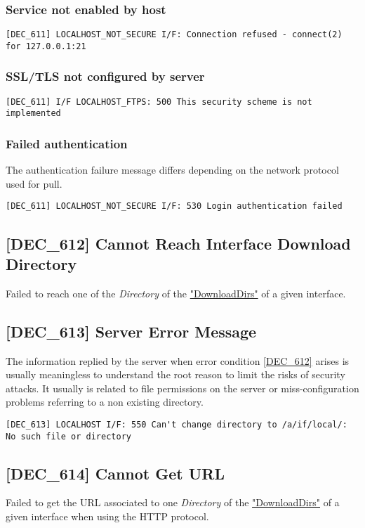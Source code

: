 \documentclass[dec_sum_main.tex]{subfiles}
\begin{document}
\subsubsection{Service not enabled by host}
\begin{verbatim}
[DEC_611] LOCALHOST_NOT_SECURE I/F: Connection refused - connect(2) for 127.0.0.1:21
\end{verbatim}

\subsubsection{SSL/TLS not configured by server}
\begin{verbatim}
[DEC_611] I/F LOCALHOST_FTPS: 500 This security scheme is not implemented
\end{verbatim}

\subsubsection{Failed authentication}
The authentication failure message differs depending on the network protocol used for pull.
\begin{verbatim}
[DEC_611] LOCALHOST_NOT_SECURE I/F: 530 Login authentication failed
\end{verbatim}

\subsection{[DEC\_612] Cannot Reach Interface Download Directory}
\label{DEC612}
Failed to reach one of the \textit{Directory} of the \hyperref[DownloadDirs]{"DownloadDirs"} of a given interface.

\subsection{[DEC\_613] Server Error Message }
The information replied by the server when error condition \hyperref[DEC612]{[DEC\_612]} arises is usually meaningless to understand the root reason to limit the risks of security attacks. It usually is related to file permissions on the server or miss-configuration problems referring to a non existing directory.
\begin{verbatim}
[DEC_613] LOCALHOST I/F: 550 Can't change directory to /a/if/local/: No such file or directory
\end{verbatim}

\label{DEC614}
\subsection{[DEC\_614] Cannot Get URL}
Failed to get the URL associated to one \textit{Directory} of the \hyperref[DownloadDirs]{"DownloadDirs"} of a given interface when using the HTTP protocol.
\end{document}
